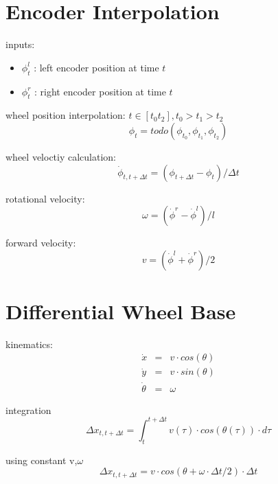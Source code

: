 \documentclass[a4paper]{article}
\begin{document}
\section{Encoder Interpolation}

inputs:
\begin{itemize}
\item $\phi_t^l$ : left encoder position at time $t$
\item $\phi_t^r$ : right encoder position at time $t$
\end{itemize}


wheel position interpolation: $t \in [t_0 t_2], t_0 > t_1 > t_2$
\begin{equation}
    \phi_t = todo( \phi_{t_0} , \phi_{t_1} , \phi_{t_2} )
\end{equation}

wheel veloctiy calculation:
\begin{equation}
    \dot\phi_{t,t+\Delta t} = (\phi_{t+\Delta t} - \phi_{t}) / \Delta t
\end{equation}

rotational velocity:
\begin{equation}
    \omega = (\dot\phi^r - \dot\phi^l) / l
\end{equation}

forward velocity:
\begin{equation}
    v = (\dot\phi^l + \dot\phi^r) / 2
\end{equation}

\section{Differential Wheel Base}

kinematics:
\begin{equation}
\begin{array}{lcl}
    \dot x &=& v \cdot cos(\theta) \\
    \dot y &=& v \cdot sin(\theta) \\
    \dot \theta &=& \omega
\end{array}
\end{equation}

integration
\begin{equation}
    \Delta x_{t,t+\Delta t} = \int_t^{t+\Delta t} v(\tau) \cdot cos(\theta(\tau)) \cdot d\tau
\end{equation}

using constant v,$\omega$
\begin{equation}
    \Delta x_{t,t+\Delta t} = v \cdot cos(\theta + \omega \cdot \Delta t / 2) \cdot \Delta t
\end{equation}
\end{document}
